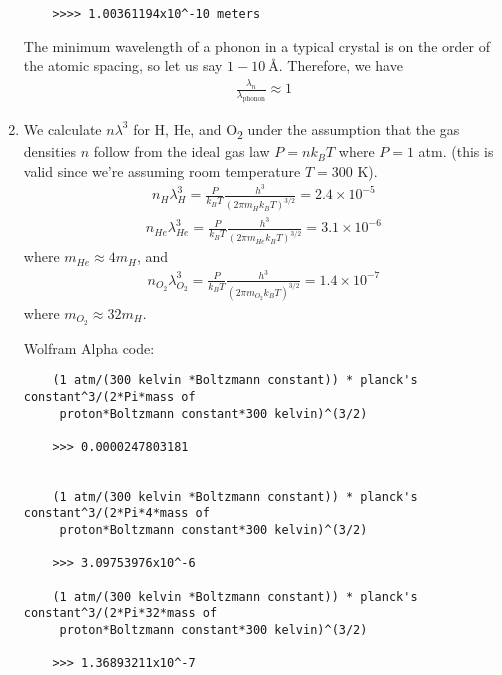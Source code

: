 \documentclass{article}
\theoremstyle{definition}
\newcommand{\f}[2]{\frac{#1}{#2}}
\begin{document}
\begin{enumerate}[label=(\alph*)]
\begin{lstlisting}
	>>>> 1.00361194x10^-10 meters
	\end{lstlisting}
	The minimum wavelength of a phonon in a typical crystal is on the order of the atomic spacing, so let us say $1-\SI{10}{\angstrom}$. Therefore, we have
	\begin{align*}
	\f{\lambda_n}{\lambda_\text{phonon}} \approx \boxed{1} 
	\end{align*}
	
	
	
	
	\item We calculate $n\lambda^3$ for H, He, and O\textsubscript{2} under the assumption that the gas densities $n$ follow from the ideal gas law $P= n k_B T$ where $P = 1$ atm. (this is valid since we're assuming room temperature $T = 300$ K).
	\begin{align*}
	n_{H}\lambda_{H}^3 =  \f{P}{k_B T}\f{h^3}{(2\pi m_H k_B T)^{3/2}} = \boxed{2.4\times 10^{-5}}
	\end{align*}
	\begin{align*}
	n_{He}\lambda_{He}^3 =  \f{P}{k_B T}\f{h^3}{(2\pi m_{He} k_B T)^{3/2}} = \boxed{3.1\times 10^{-6}}
	\end{align*}
	where $m_{He} \approx 4 m_H$, and 
	\begin{align*}
	n_{O_2}\lambda_{O_2}^3 =  \f{P}{k_B T}\f{h^3}{(2\pi m_{O_2} k_B T)^{3/2}} = \boxed{1.4\times 10^{-7}}
	\end{align*}
	where $m_{O_2} \approx 32 m_H$. 
	
	Wolfram Alpha code:
	\begin{lstlisting}
	(1 atm/(300 kelvin *Boltzmann constant)) * planck's constant^3/(2*Pi*mass of
	 proton*Boltzmann constant*300 kelvin)^(3/2)
	
	>>> 0.0000247803181
	
	
	(1 atm/(300 kelvin *Boltzmann constant)) * planck's constant^3/(2*Pi*4*mass of
	 proton*Boltzmann constant*300 kelvin)^(3/2)
	
	>>> 3.09753976x10^-6
	
	(1 atm/(300 kelvin *Boltzmann constant)) * planck's constant^3/(2*Pi*32*mass of
	 proton*Boltzmann constant*300 kelvin)^(3/2)
	
	>>> 1.36893211x10^-7
	\end{lstlisting}
	

\end{enumerate}
\end{document}
